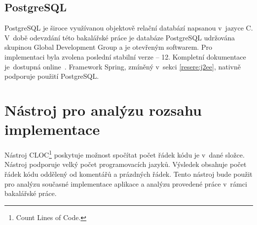     \subsection{PostgreSQL}
        PostgreSQL je široce využívanou objektově relační databází napsanou v~jazyce C. V~době odevzdání této bakalářské práce je databáze PostgreSQL udržována skupinou Global Development Group a je otevřeným softwarem. Pro implementaci byla zvolena poslední stabilní verze -- 12. Kompletní dokumentace je~dostupná online~\cite{postgres-documentation}. Framework Spring, zmíněný v~sekci \ref{resere:j2ee}, nativně podporuje použití PostgreSQL.
        

\section{Nástroj pro analýzu rozsahu implementace}\label{reserse:cloc}
    Nástroj CLOC\footnote{Count Lines of Code.}\cite{cloc-download} poskytuje možnost spočítat počet řádek kódu je v~dané složce. Nástroj podporuje velký počet programovacích jazyků. Výsledek obsahuje počet řádek kódu oddělený od komentářů a prázdných řádek. Tento nástroj bude použit pro analýzu současné implementace aplikace a analýzu provedené práce v~rámci bakalářské práce.